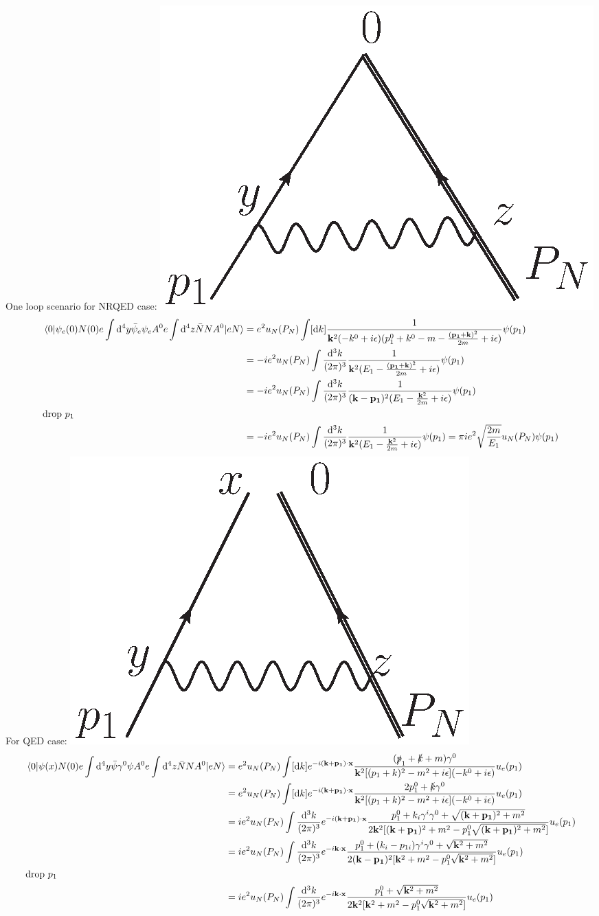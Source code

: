 \documentclass{article}
\newcommand{\g}{\gamma}
\begin{document}
 One loop scenario for NRQED case:
 \includegraphics[width=1.2 in]{OPE-1.eps}
 \begin{align*}
    \mel{0}{\psi_e(0)N(0)e\int\dd^4y\bar\psi_e\psi_e A^0e\int\dd^4z\bar NNA^0}{eN}&=e^2u_N(P_N)\int[\dd k]\frac{1}{\vb{k}^2(-k^0+i\epsilon)(p_1^0+k^0-m-\frac{\vb{(p_1+k)}^2}{2m}+i\epsilon)}\psi(p_1)\\
  &=-ie^2u_N(P_N)\int\frac{\dd^3k}{(2\pi)^3}\frac{1}{\vb{k}^2(E_1-\frac{\vb{(p_1+k)}^2}{2m}+i\epsilon)}\psi(p_1)\\
  &=-ie^2u_N(P_N)\int\frac{\dd^3k}{(2\pi)^3}\frac{1}{(\vb{k}-\vb{p_1})^2(E_1-\frac{\vb{k}^2}{2m}+i\epsilon)}\psi(p_1)\\
  \intertext{drop $p_1$}
  &=-ie^2u_N(P_N)\int\frac{\dd^3k}{(2\pi)^3}\frac{1}{\vb{k}^2(E_1-\frac{\vb{k}^2}{2m}+i\epsilon)}\psi(p_1)=\pi ie^2\sqrt{\frac{2m}{E_1}}u_N(P_N)\psi(p_1)
 \end{align*}
For QED case:
\includegraphics[width=1.2 in]{OPE-2.eps}
\begin{align*}
  \mel{0}{\psi(x)N(0)e\int\dd^4y\bar\psi\g^0\psi A^0 e\int\dd^4 z \bar N NA^0}{eN}&=e^2u_N(P_N)\int[\dd k]e^{-i\vb{(k+p_1)}\cdot\vb{x}}\frac{(\slashed p_1+\slashed k+m)\g^0}{\vb{k}^2[(p_1+k)^2-m^2+i\epsilon](-k^0+i\epsilon)}u_e(p_1)\\
  &=e^2u_N(P_N)\int[\dd k]e^{-i\vb{(k+p_1)}\cdot\vb{x}}\frac{2p_1^0+\slashed k\g^0}{\vb{k}^2[(p_1+k)^2-m^2+i\epsilon](-k^0+i\epsilon)}u_e(p_1)\\
  &=ie^2u_N(P_N)\int\frac{\dd^3 k}{(2\pi)^3}e^{-i\vb{(k+p_1)}\cdot\vb{x}}\frac{p_1^0+k_i\g^i\g^0+\sqrt{(\vb{k}+\vb{p_1})^2+m^2}}{2\vb{k}^2[(\vb{k}+\vb{p_1})^2+m^2-p_1^0\sqrt{(\vb{k}+\vb{p_1})^2+m^2}]}u_e(p_1)\\
  &=ie^2u_N(P_N)\int\frac{\dd^3 k}{(2\pi)^3}e^{-i\vb{k}\cdot\vb{x}}\frac{p_1^0+(k_i-p_{1i})\g^i\g^0+\sqrt{\vb{k}^2+m^2}}{2(\vb{k}-\vb{p_1})^2[\vb{k}^2+m^2-p_1^0\sqrt{\vb{k}^2+m^2}]}u_e(p_1)\\
  \intertext{drop $p_1$}
  &=ie^2u_N(P_N)\int\frac{\dd^3 k}{(2\pi)^3}e^{-i\vb{k}\cdot\vb{x}}\frac{p_1^0+\sqrt{\vb{k}^2+m^2}}{2\vb{k}^2[\vb{k}^2+m^2-p_1^0\sqrt{\vb{k}^2+m^2}]}u_e(p_1)
 \end{align*}
\end{document}
